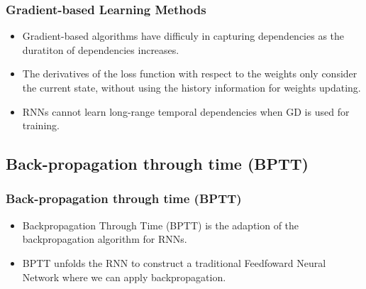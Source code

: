\documentclass[
	11pt,
]{beamer}
\begin{document}

\begin{frame}
	\frametitle{Gradient-based Learning Methods}
	\begin{itemize}
		\item Gradient-based algorithms have difficuly in capturing dependencies as the duratiton of dependencies increases.
		\bigskip
		\item The derivatives of the loss function with respect to the weights only consider the current state, without using the history information for weights updating.
		\bigskip
		\item  RNNs cannot learn long-range temporal dependencies when GD is used for training.
	\end{itemize}
\end{frame}

\subsection{Back-propagation through time (BPTT)}

\begin{frame}
	\frametitle{Back-propagation through time (BPTT)}
	\begin{itemize}
		\item Backpropagation Through Time (BPTT) is the adaption of the backpropagation algorithm for RNNs.
		\bigskip 
		\item BPTT unfolds the RNN to construct a traditional Feedfoward Neural Network where we can apply backpropagation.
        \bigskip %
		\par
		\hfill
		\par

			
\end{itemize}
\end{frame}
\end{document}
